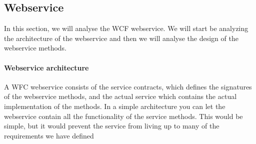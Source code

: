 \documentclass[a4paper,11pt,report]{article}
\begin{document}
\subsection{Webservice}
In this section, we will analyse the WCF webservice. We will start be analyzing the architecture of the webservice and then we will analyse the design of the webservice methods. 

\paragraph{Webservice architecture}
A WFC webservice consists of the service contracts, which defines the signatures of the webservice methods, and the actual service which contains the actual implementation of the methods. In a simple architecture you can let the webservice contain all the functionality of the service methods. This would be simple, but it would prevent the service from living up to many of the requirements we have defined  
\end{document}
